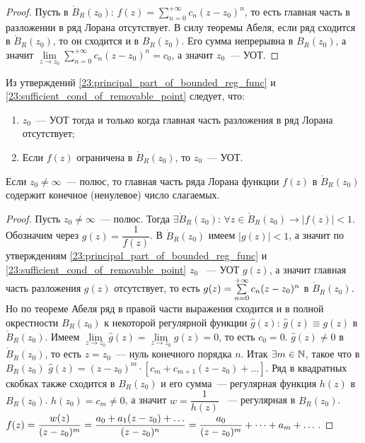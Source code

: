 \begin{proof}
Пусть в \(\mathring{B}_R(z_0)\colon \, f(z) = \sum\limits_{n = 0}^{+\infty} c_n (z-z_0)^n\), то
есть главная часть в разложении в ряд Лорана отсутствует. В силу теоремы Абеля, если ряд
сходится в \(\mathring{B}_R(z_0)\), то он сходится и в \(B_R(z_0)\). Его сумма непрерывна в
\(B_R(z_0)\), а значит \(\lim\limits_{z \to z_0} \sum\limits_{n = 0}^{+\infty} c_n (z-z_0)^n =
c_0\), а значит \(z_0\)~--- УОТ.
\end{proof}

\begin{corollary} \label{23:criterion_removable_point}
Из утверждений \ref{23:principal_part_of_bounded_reg_func} и
\ref{23:sufficient_cond_of_removable_point} следует, что:
\begin{enumerate}[wide=20pt, label=\arabic*., itemsep=0ex]
\item \(z_0\)~--- УОТ тогда и только когда главная часть разложения в ряд Лорана
    отсутствует;
\item Если \(f(z)\) ограничена в \(\mathring{B}_R(z_0)\), то \(z_0\)~--- УОТ.
\end{enumerate}
\end{corollary}

\begin{statement}
Если \(z_0 \ne \infty\)~--- полюс, то главная часть ряда Лорана функции \(f(z)\) в \(\mathring{B}
_R(z_0)\) содержит конечное (ненулевое) число слагаемых.
\end{statement}

\begin{proof}
Пусть \(z_0 \ne \infty\)~--- полюс. Тогда \(\exists \mathring{B}_R(z_0) \colon \, \forall z \in
\mathring{B}_R(z_0) \rightarrow |f(z)| < 1\). Обозначим через \(g(z) = \dfrac{1}{f(z)}\). В
\(\mathring{B}_R(z_0)\) имеем \(|g(z)| < 1\), а значит по утверждениям
\ref{23:principal_part_of_bounded_reg_func} и \ref{23:sufficient_cond_of_removable_point} \(z_0\)
~--- УОТ \(g(z)\), а значит главная часть разложения \(g(z)\) отсутствует, то есть \(g(z) =
\sum\limits_{n = 0}^{+\infty} c_n (z\hm-z_0)^n\) в \(\mathring{B}_R(z_0)\). Но по теореме Абеля ряд в
правой части выражения сходится и в полной окрестности \(B_R(z_0)\) к некоторой регулярной функции
\(\hat{g}(z)\colon \, \hat{g}(z) \equiv g(z)\) в \(\mathring{B}_R(z_0)\). Имеем
\(\lim\limits_{z \to z_0} \hat{g}(z) = \lim\limits_{z \to z_0} g(z) = 0\), то есть \(c_0 = 0\).
\(\hat{g}(z) \ne 0\) в \(\mathring{B}_R(z_0)\), то есть \(z = z_0\)~--- нуль конечного порядка
\(n\). Итак \(\exists m \in \mathbb{N}\), такое что в \(B_R(z_0)\) \(\hat{g}(z) = (z-z_0)^m\cdot[c_m +
c_{m+1} (z - z_0) + \dots]\). Ряд в квадратных скобках также сходится в \(B_R(z_0)\) и его сумма~---
регулярная функция \(h(z)\) в \(B_R(z_0)\). \(h(z_0) = c_m \ne 0\), а значит \(w = \dfrac{1}{h(z)}\)
~--- регулярная в \(B_R(z_0)\). \(f(z) = \dfrac{w(z)}{(z-z_0)^m} \hm= \dfrac{a_0 + a_1 (z - z_0) +
\dots}{(z-z_0)^n} = \dfrac{a_0}{(z-z_0)^m} + \dots + a_m + \dots\).
\end{proof}

